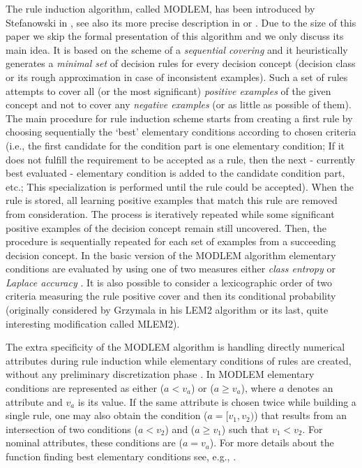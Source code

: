 \documentclass{llncs}
\begin{document}
The rule induction algorithm, called MODLEM, has been introduced by
Stefanowski in \cite{modlem}, see also its more precise description in
\cite{habcia} or \cite{GrzymStef}. Due to the size of this paper we skip the
formal presentation of this algorithm and we only discuss its main idea. It
is based on the scheme of a \emph{sequential covering} and it heuristically
generates a {\em minimal set} of decision rules for every decision concept
(decision class or its rough approximation in case of inconsistent
examples). Such a set of rules attempts to cover all (or the most
significant) \emph{positive examples} of the given concept and not to cover
any \emph{negative examples} (or as little as possible of them). The main
procedure for rule induction scheme starts from creating a first rule by
choosing sequentially the `best' elementary conditions according to chosen
criteria (i.e., the first candidate for the condition part is one elementary
condition; If it does not fulfill the requirement to be accepted as a rule,
then the next - currently best evaluated - elementary condition is added to
the candidate condition part, etc.; This specialization is performed until
the rule could be accepted). When the rule is stored, all learning positive
examples that match this rule are removed from consideration. The process is
iteratively repeated while some significant positive examples of the
decision concept remain still uncovered. Then, the procedure is sequentially
repeated for each set of examples from a succeeding decision concept. In the
basic version of the MODLEM algorithm elementary conditions are evaluated by
using one of two measures either {\em class entropy} or {\em Laplace
accuracy} \cite{modlem,habcia}. It is also possible to consider a
lexicographic order of two criteria measuring the rule positive cover and
then its conditional probability (originally considered by Grzymala in his
LEM2 algorithm or its last, quite interesting modification called MLEM2).

The extra specificity of the MODLEM algorithm is handling directly numerical
attributes during rule induction while elementary conditions of rules are
created, without any preliminary discretization phase \cite{GrzymStef}. In
MODLEM elementary conditions are represented as either ($a < v_a$) or ($a
\geq v_a$), where $a$ denotes an attribute and $v_a$ is its value. If the
same attribute is chosen twice while building a single rule, one may also
obtain the condition ($a = [v_1, v_2)$) that results from an intersection of
two conditions ($a < v_2$) and ($a \geq v_1$) such that $v_1 < v_2$. For
nominal attributes, these conditions are ($a = v_a$). For more details about
the function finding best elementary conditions see, e.g.,
\cite{GrzymStef,modlem}.
\end{document}
